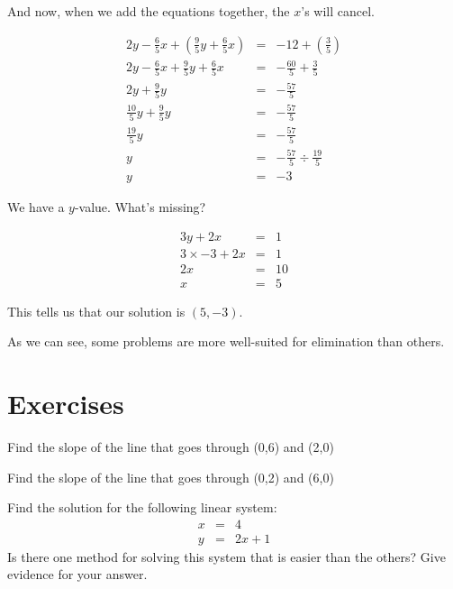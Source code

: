 \begin{example}
And now, when we add the equations together, the $x$'s will cancel.

$$\begin{array}{rcl}
2y - \frac{6}{5}x + (\frac{9}{5}y + \frac{6}{5}x) & = & -12 + (\frac{3}{5}) \\
2y - \frac{6}{5}x + \frac{9}{5}y + \frac{6}{5}x & = & -\frac{60}{5} + \frac{3}{5} \\
2y + \frac{9}{5}y & = & -\frac{57}{5} \\
\frac{10}{5}y + \frac{9}{5}y & = & -\frac{57}{5} \\
\frac{19}{5}y & = & -\frac{57}{5} \\
y & = & -\frac{57}{5} \div \frac{19}{5}\\
y & = & -3
\end{array}$$

We have a $y$-value.  What's missing?

$$\begin{array}{rcl}
3y + 2x & = & 1\\
3 \times -3 + 2x & = & 1 \\
2x & = & 10 \\
x & = & 5 \end{array}$$

This tells us that our solution is $(5,-3)$.
\end{example}

As we can see, some problems are more well-suited for elimination than others.

\pagebreak

\section*{Exercises}

\begin{exercise}
Find the slope of the line that goes through (0,6) and (2,0)
\end{exercise}

\bigskip

\begin{exercise}
Find the slope of the line that goes through (0,2) and (6,0)
\end{exercise}

\bigskip

\begin{exercise}
	Find the solution for the following linear system:
	$$
	\begin{array}{rcl}
	x & = & 4 \\
	y & = & 2x+1	
	\end{array}
	$$
	Is there one method for solving this system that is easier than the others? Give evidence for your answer. 
\end{exercise}
\bigskip

